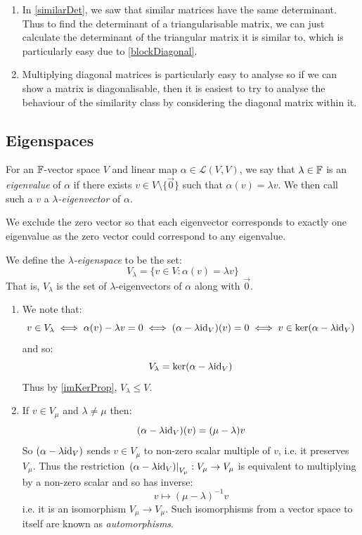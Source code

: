 \documentclass[../main.tex]{subfiles}
\begin{document}
\begin{remark}[Motivation]
  \begin{enumerate}
    \item In \cref{similarDet}, we saw that similar matrices have the same determinant.
      Thus to find the determinant of a triangularisable matrix, we can just calculate the determinant of the triangular matrix it is similar to, which is particularly easy due to \cref{blockDiagonal}.
    \item Multiplying diagonal matrices is particularly easy to analyse so if we can show a matrix is diagonalisable, then it is easiest to try to analyse the behaviour of the similarity class by considering the diagonal matrix within it.
  \end{enumerate}
\end{remark}
\subsection{Eigenspaces}
\begin{definition}
  For an $\mathbb{F}$-vector space $V$ and linear map $\alpha \in \mathcal{L}(V, V)$, we say that $\lambda \in \mathbb{F}$ is an \textit{eigenvalue} of $\alpha$ if there exists $v \in V \setminus \{\vec{0}\}$ such that $\alpha(v) = \lambda v$.
  We then call such a $v$ a \textit{$\lambda$-eigenvector} of $\alpha$.
\end{definition}
\begin{remark}
  We exclude the zero vector so that each eigenvector corresponds to exactly one eigenvalue as the zero vector could correspond to any eigenvalue.
\end{remark}
\begin{definition}
  We define the \textit{$\lambda$-eigenspace} to be the set:
  \[
    V_{\lambda} = \{v \in V: \alpha(v) = \lambda v\}
  \]
  That is, $V_{\lambda}$ is the set of $\lambda$-eigenvectors of $\alpha$ along with $\vec{0}$.
\end{definition}
\begin{remark}
  \begin{enumerate}
    \item We note that:
      \[
        v \in V_{\lambda} \iff \alpha(v) - \lambda v = 0 \iff (\alpha - \lambda \mathrm{id}_V)(v) = 0 \iff v \in \ker(\alpha - \lambda \mathrm{id}_V)
      \]
      and so:
      \[
        V_{\lambda} = \ker(\alpha - \lambda\mathrm{id}_V)
      \]
      Thus by \cref{imKerProp}, $V_{\lambda} \leq V$.
    \item If $v \in V_{\mu}$ and $\lambda \neq \mu$ then:
      \[
        (\alpha - \lambda \mathrm{id}_V)(v) = (\mu - \lambda)v
      \]
      So $(\alpha - \lambda\mathrm{id}_V)$ sends $v \in V_{\mu}$ to non-zero scalar multiple of $v$, i.e. it preserves $V_{\mu}$.
      Thus the restriction $\left. (\alpha - \lambda \mathrm{id}_V) \right|_{V_\mu}: V_\mu \to V_\mu$ is equivalent to multiplying by a non-zero scalar and so has inverse:
      \[
      v \mapsto (\mu - \lambda)^{-1} v
      \]
      i.e. it is an isomorphism $V_{\mu} \to V_{\mu}$.
      Such isomorphisms from a vector space to itself are known as \textit{automorphisms}.
  \end{enumerate}
\end{remark}
\end{document}

